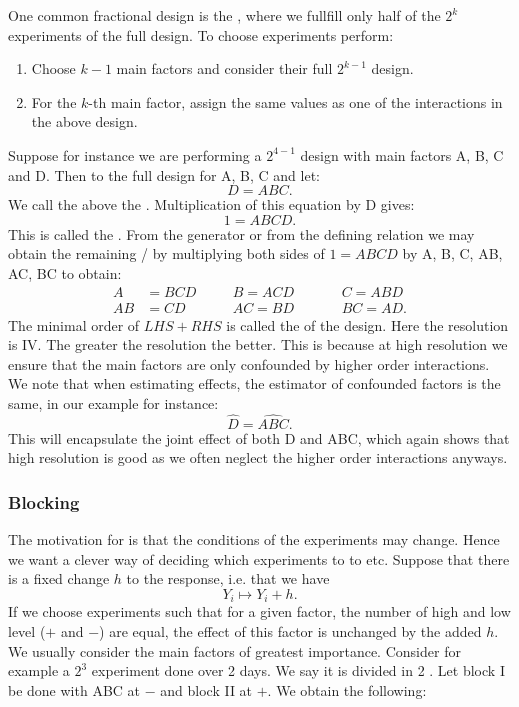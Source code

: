 One common fractional design is the , where we fullfill only half of the $2^k$ experiments of the full design. To choose experiments perform:
\begin{enumerate}
    \item Choose $k-1$ main factors and consider their full $2^{k-1}$ design.
    \item For the $k$-th main factor, assign the same values as one of the interactions in the above design. 
\end{enumerate}
Suppose for instance we are performing a $2^{4-1}$ design with main factors A, B, C and D. Then to the full design for A, B, C and let:
$$
    D = ABC.
$$
We call the above the . Multiplication of this equation by D gives:
$$
    1 = ABCD.
$$
This is called the . From the generator or from the defining relation we may obtain the remaining  /  by multiplying both sides of $1=ABCD$ by A, B, C, AB, AC, BC to obtain:
\begin{align*}
        A &= BCD \quad &&B = ACD \quad &&&C = ABD \\
        AB &= CD \quad &&AC = BD \quad &&&BC = AD.
\end{align*}
The minimal order of $LHS+RHS$ is called the  of the design. Here the resolution is IV. The greater the resolution the better. This is because at high resolution we ensure that the main factors are only confounded by higher order interactions. We note that when estimating effects, the estimator of confounded factors is the same, in our example for instance:
$$
    \hat{D} = \hat{ABC}.
$$
This will encapsulate the joint effect of both D and ABC, which again shows that high resolution is good as we often neglect the higher order interactions anyways. 

\subsubsection{Blocking}

The motivation for  is that the conditions of the experiments may change. Hence we want a clever way of deciding which experiments to to  etc. Suppose that there is a fixed change $h$ to the response, i.e. that  we have
$$
    Y_i \mapsto Y_i + h.
$$
If we choose experiments such that for a given factor, the number of high and low level ($+$ and $-$) are equal, the effect of this factor is unchanged by the added $h$. We usually consider the main factors of greatest importance. Consider for example a $2^3$ experiment done over 2 days. We say it is divided in 2 . Let block I be done with ABC at $-$ and block II at $+$. We obtain the following:

